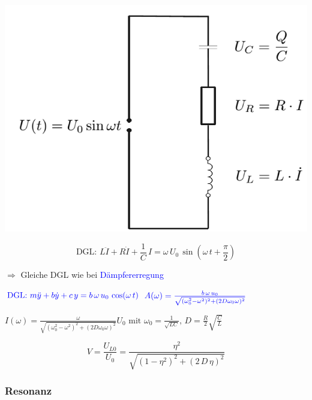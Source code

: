 \begin{minipage}{0.3\linewidth}
\includegraphics[width=\linewidth]{Bilder/Wellen-Optik/schwingkreis}  \\
\end{minipage}
\hfill
\begin{minipage}{0.68\linewidth}
$$ \boxed{ \text{DGL: } L \ddot{I} + R \dot{I} + \frac{1}{C} \, I = \omega \, U_0 \,\sin(\omega \, t + \frac{\pi}{2}) } $$

$\Rightarrow$ Gleiche DGL wie bei \textcolor{blue}{Dämpfererregung} \\
\end{minipage}


$ \textcolor{blue}{\text{DGL: } m \ddot{y} + b \dot{y} + c \, y = b \, \omega \, u_0 \, \cos(\omega \, t) } $
\quad
$ \textcolor{blue}{A(\omega) =  \frac{b \, \omega \, u_0}{\sqrt{(\omega_0^2 -\omega^2)^2 + (2D \omega_0 \omega)^2}} } $ \\

\vspace{0.1cm}


$ \boxed{ I(\omega) =  \frac{\omega}{\sqrt{(\omega_0^2 -\omega^2)^2 + (2D \omega_0 \omega)^2}}U_0  \text{  mit }\omega_0 = \frac{1}{\sqrt{LC}} , \, D = \frac{R}{2}\sqrt{\frac{C}{L}}} $ 

\vspace{0.1cm}

$$ \boxed{ V = \frac{U_{L0}}{U_0} = \frac{\eta^2}{\sqrt{(1 - \eta^2)^2 + (2 \, D \, \eta)^2}} }$$



\subsubsection{Resonanz}

